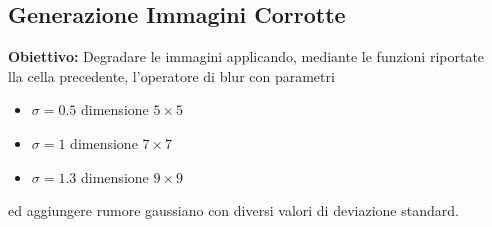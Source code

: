\subsection{Generazione Immagini Corrotte}
\textbf{Obiettivo:}
Degradare le immagini applicando, mediante le funzioni riportate \\lla cella precedente,  l'operatore di blur con parametri
\begin{itemize}
    \item{$\sigma=0.5$ dimensione $5\times 5$}
    \item{$\sigma=1$ dimensione $7\times 7$}
    \item{$\sigma=1.3$ dimensione $9\times 9$}
\end{itemize}
ed aggiungere rumore gaussiano con diversi valori di deviazione standard.


